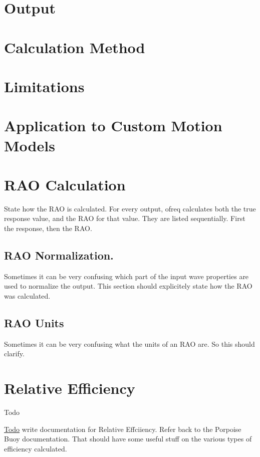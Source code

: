 \section*{Output}

\section*{Calculation Method}

\section*{Limitations}

\section*{Application to Custom Motion Models}

\section*{R\-A\-O Calculation}

State how the R\-A\-O is calculated. For every output, ofreq calculates both the true response value, and the R\-A\-O for that value. They are listed sequentially. First the response, then the R\-A\-O.

\subsection*{R\-A\-O Normalization.}

Sometimes it can be very confusing which part of the input wave properties are used to normalize the output. This section should explicitely state how the R\-A\-O was calculated.

\subsection*{R\-A\-O Units}

Sometimes it can be very confusing what the units of an R\-A\-O are. So this should clarify. \hypertarget{efficiency_relative}{}\section{Relative Efficiency}\label{efficiency_relative}
\begin{DoxyRefDesc}{Todo}
\item[\hyperlink{todo__todo000017}{Todo}]write documentation for Relative Effciiency. Refer back to the Porpoise Buoy documentation. That should have some useful stuff on the various types of efficiency calculated.\end{DoxyRefDesc}


